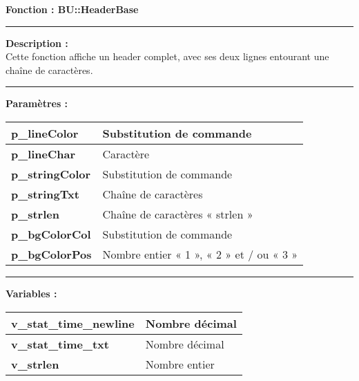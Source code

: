 \documentclass[a4paper,10pt]{article}
\begin{document}
\textbf{Fonction : \color{mauve}BU::HeaderBase}\\

\par\noindent\rule{\textwidth}{0.4pt}

\begin{justify}
    \textbf{Description :}\\[1\baselineskip]
    Cette fonction affiche un header complet, avec ses deux lignes entourant une chaîne de caractères.
\end{justify}

\par\noindent\rule{\textwidth}{0.4pt}

\begin{justify}
    \textbf{Paramètres :}

    \begin{tabular}{|l|l|}
        \hline
        \textbf{\color{orange}p\_lineColor} & Substitution de commande\\ 
        \hline
        \textbf{\color{orange}p\_lineChar} & Caractère\\ 
        \hline
        \textbf{\color{orange}p\_stringColor} & Substitution de commande\\ 
        \hline
        \textbf{\color{orange}p\_stringTxt} & Chaîne de caractères\\ 
        \hline
        \textbf{\color{orange}p\_strlen} & Chaîne de caractères « strlen »\\
        \hline
        \textbf{\color{orange}p\_bgColorCol} & Substitution de commande\\
        \hline
        \textbf{\color{orange}p\_bgColorPos} & Nombre entier « 1 », « 2 » et / ou « 3 »\\
        \hline
    \end{tabular}
\end{justify}

\setlength{\parskip}{2em}
\par\noindent\rule{\textwidth}{0.4pt}\setlength{\parskip}{1em}

\begin{justify}
    \textbf{Variables :}\\[1\baselineskip]
    \begin{tabular}{|l|l|}
        \hline
        \textbf{\color{orange}v\_stat\_time\_newline} & Nombre décimal\\
        \hline
        \textbf{\color{orange}v\_stat\_time\_txt} & Nombre décimal\\
        \hline
        \textbf{\color{orange}v\_strlen} & Nombre entier\\
        \hline
    \end{tabular}
\end{justify}
\end{document}
